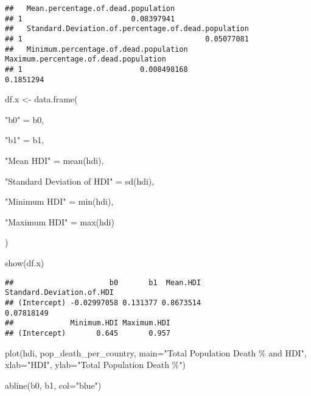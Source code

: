 \documentclass[
  12pt,
]{article}
\newenvironment{Shaded}{\begin{snugshade}}{\end{snugshade}}
\newcommand{\AttributeTok}[1]{\textcolor[rgb]{0.77,0.63,0.00}{#1}}
\newcommand{\FunctionTok}[1]{\textcolor[rgb]{0.00,0.00,0.00}{#1}}
\newcommand{\NormalTok}[1]{#1}
\newcommand{\OtherTok}[1]{\textcolor[rgb]{0.56,0.35,0.01}{#1}}
\newcommand{\StringTok}[1]{\textcolor[rgb]{0.31,0.60,0.02}{#1}}
\begin{document}
\begin{verbatim}
##   Mean.percentage.of.dead.population
## 1                         0.08397941
##   Standard.Deviation.of.percentage.of.dead.population
## 1                                          0.05077081
##   Minimum.percentage.of.dead.population Maximum.percentage.of.dead.population
## 1                           0.008498168                             0.1851294
\end{verbatim}

\begin{Shaded}
\begin{Highlighting}[]
\NormalTok{df.x }\OtherTok{\textless{}{-}} \FunctionTok{data.frame}\NormalTok{(}

  \StringTok{"b0"} \OtherTok{=}\NormalTok{ b0,}

  \StringTok{"b1"} \OtherTok{=}\NormalTok{ b1,}

  \StringTok{"Mean HDI"} \OtherTok{=} \FunctionTok{mean}\NormalTok{(hdi),}

  \StringTok{"Standard Deviation of HDI"} \OtherTok{=} \FunctionTok{sd}\NormalTok{(hdi),}

  \StringTok{"Minimum HDI"} \OtherTok{=} \FunctionTok{min}\NormalTok{(hdi),}

  \StringTok{"Maximum HDI"} \OtherTok{=} \FunctionTok{max}\NormalTok{(hdi)}

\NormalTok{)}

\FunctionTok{show}\NormalTok{(df.x)}
\end{Highlighting}
\end{Shaded}

\begin{verbatim}
##                      b0       b1  Mean.HDI Standard.Deviation.of.HDI
## (Intercept) -0.02997058 0.131377 0.8673514                0.07818149
##             Minimum.HDI Maximum.HDI
## (Intercept)       0.645       0.957
\end{verbatim}

\begin{Shaded}
\begin{Highlighting}[]
\FunctionTok{plot}\NormalTok{(hdi, pop\_death\_per\_country, }\AttributeTok{main=}\StringTok{"Total Population Death \% and HDI"}\NormalTok{, }\AttributeTok{xlab=}\StringTok{"HDI"}\NormalTok{, }\AttributeTok{ylab=}\StringTok{"Total Population Death \%"}\NormalTok{)}

\FunctionTok{abline}\NormalTok{(b0, b1, }\AttributeTok{col=}\StringTok{"blue"}\NormalTok{)}
\end{Highlighting}
\end{Shaded}
\end{document}
